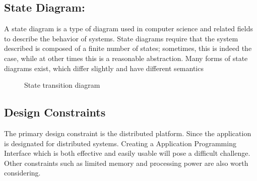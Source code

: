 \documentclass[oneside,a4paper,12pt]{report}
\begin{document}
\subsection{State Diagram:}	
A state diagram is a type of diagram used in computer science and related fields to describe the behavior of systems. State diagrams require that the system described is composed of a finite number of states; sometimes, this is indeed the case, while at other times this is a reasonable abstraction. Many forms of state diagrams exist, which differ slightly and have different semantics


\begin{center}
	\begin{figure}[H]
		\centering
	  \caption{State transition diagram}
	  \label{fig:state-dig}
	\end{figure}
\end{center} 
 
 \subsection{Design Constraints}	
The primary design constraint is the distributed platform. Since the application is designated for distributed systems. Creating a Application Programming  Interface which is both effective and easily usable will pose a difficult challenge. Other constraints such as limited memory and processing power are also worth considering.
\end{document}
